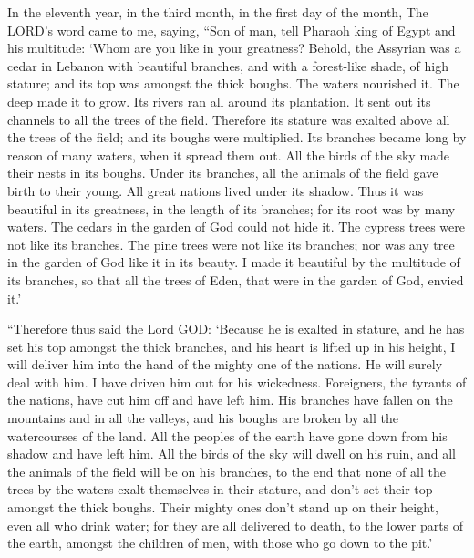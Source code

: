  In the eleventh year, in the third month, in the first day
of the month, The LORD's word came to me, saying,  ``Son of
man, tell Pharaoh king of Egypt and his multitude: `Whom are you like in
your greatness?  Behold, the Assyrian was a cedar in Lebanon
with beautiful branches, and with a forest-like shade, of high stature;
and its top was amongst the thick boughs.  The waters
nourished it. The deep made it to grow. Its rivers ran all around its
plantation. It sent out its channels to all the trees of the field.
 Therefore its stature was exalted above all the trees of
the field; and its boughs were multiplied. Its branches became long by
reason of many waters, when it spread them out.  All the
birds of the sky made their nests in its boughs. Under its branches, all
the animals of the field gave birth to their young. All great nations
lived under its shadow.  Thus it was beautiful in its
greatness, in the length of its branches; for its root was by many
waters.  The cedars in the garden of God could not hide it.
The cypress trees were not like its branches. The pine trees were not
like its branches; nor was any tree in the garden of God like it in its
beauty.  I made it beautiful by the multitude of its
branches, so that all the trees of Eden, that were in the garden of God,
envied it.'

 ``Therefore thus said the Lord GOD: `Because he is exalted
in stature, and he has set his top amongst the thick branches, and his
heart is lifted up in his height,  I will deliver him into
the hand of the mighty one of the nations. He will surely deal with him.
I have driven him out for his wickedness.  Foreigners, the
tyrants of the nations, have cut him off and have left him. His branches
have fallen on the mountains and in all the valleys, and his boughs are
broken by all the watercourses of the land. All the peoples of the earth
have gone down from his shadow and have left him.  All the
birds of the sky will dwell on his ruin, and all the animals of the
field will be on his branches,  to the end that none of all
the trees by the waters exalt themselves in their stature, and don't set
their top amongst the thick boughs. Their mighty ones don't stand up on
their height, even all who drink water; for they are all delivered to
death, to the lower parts of the earth, amongst the children of men,
with those who go down to the pit.'

